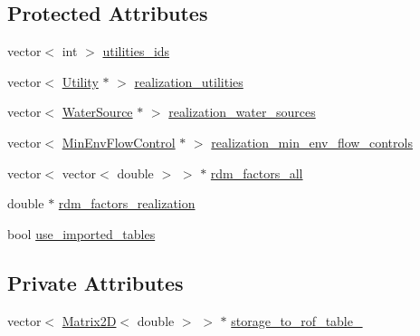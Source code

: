 \subsection*{Protected Attributes}
\begin{DoxyCompactItemize}
\item 
vector$<$ int $>$ \mbox{\hyperlink{classDroughtMitigationPolicy_ad19fbc5a9fdf17ed50c0ba0b99d47eca_ad19fbc5a9fdf17ed50c0ba0b99d47eca}{utilities\+\_\+ids}}
\item 
vector$<$ \mbox{\hyperlink{classUtility}{Utility}} $\ast$ $>$ \mbox{\hyperlink{classDroughtMitigationPolicy_af6e5787a58017804d8598effbeeaba8e_af6e5787a58017804d8598effbeeaba8e}{realization\+\_\+utilities}}
\item 
vector$<$ \mbox{\hyperlink{classWaterSource}{Water\+Source}} $\ast$ $>$ \mbox{\hyperlink{classDroughtMitigationPolicy_ae2104e99c421513902ba66d012484c0e_ae2104e99c421513902ba66d012484c0e}{realization\+\_\+water\+\_\+sources}}
\item 
vector$<$ \mbox{\hyperlink{classMinEnvFlowControl}{Min\+Env\+Flow\+Control}} $\ast$ $>$ \mbox{\hyperlink{classDroughtMitigationPolicy_af583979405bc5d530ee576df8a6e9324_af583979405bc5d530ee576df8a6e9324}{realization\+\_\+min\+\_\+env\+\_\+flow\+\_\+controls}}
\item 
vector$<$ vector$<$ double $>$ $>$ $\ast$ \mbox{\hyperlink{classDroughtMitigationPolicy_a4c5a2dc2aa3a1c7550cdb17045e1fef3_a4c5a2dc2aa3a1c7550cdb17045e1fef3}{rdm\+\_\+factors\+\_\+all}}
\item 
double $\ast$ \mbox{\hyperlink{classDroughtMitigationPolicy_abef5c917bbc076514fe61bfebbd0e4fc_abef5c917bbc076514fe61bfebbd0e4fc}{rdm\+\_\+factors\+\_\+realization}}
\item 
bool \mbox{\hyperlink{classDroughtMitigationPolicy_ace2a2425f6608c34a3189c11445978a1_ace2a2425f6608c34a3189c11445978a1}{use\+\_\+imported\+\_\+tables}}
\end{DoxyCompactItemize}
\subsection*{Private Attributes}
\begin{DoxyCompactItemize}
\item 
vector$<$ \mbox{\hyperlink{classMatrix2D}{Matrix2D}}$<$ double $>$ $>$ $\ast$ \mbox{\hyperlink{classDroughtMitigationPolicy_aa7d724adcd8ebcd5641de13b8f08098c_aa7d724adcd8ebcd5641de13b8f08098c}{storage\+\_\+to\+\_\+rof\+\_\+table\+\_\+}}
\end{DoxyCompactItemize}



